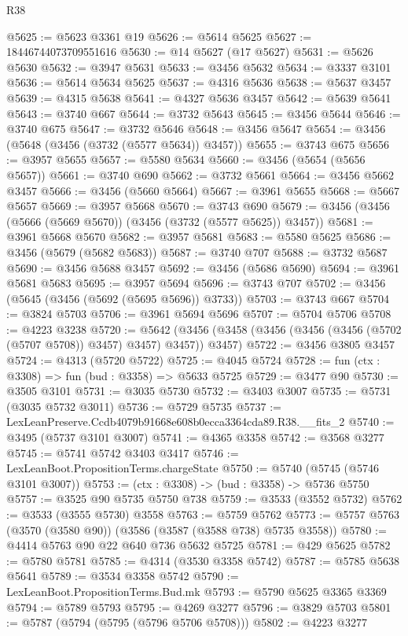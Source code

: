 \begin{lexlean}{R38}
\begin{coremodule}
@5625 := @5623 @3361 @19
@5626 := @5614 @5625
@5627 := 18446744073709551616
@5630 := @14 @5627 (@17 @5627)
@5631 := @5626 @5630
@5632 := @3947 @5631
@5633 := @3456 @5632
@5634 := @3337 @3101
@5636 := @5614 @5634 @5625
@5637 := @4316 @5636
@5638 := @5637 @3457
@5639 := @4315 @5638
@5641 := @4327 @5636 @3457
@5642 := @5639 @5641
@5643 := @3740 @667
@5644 := @3732 @5643
@5645 := @3456 @5644
@5646 := @3740 @675
@5647 := @3732 @5646
@5648 := @3456 @5647
@5654 := @3456 (@5648 (@3456 (@3732 (@5577 @5634)) @3457))
@5655 := @3743 @675
@5656 := @3957 @5655
@5657 := @5580 @5634
@5660 := @3456 (@5654 (@5656 @5657))
@5661 := @3740 @690
@5662 := @3732 @5661
@5664 := @3456 @5662 @3457
@5666 := @3456 (@5660 @5664)
@5667 := @3961 @5655
@5668 := @5667 @5657
@5669 := @3957 @5668
@5670 := @3743 @690
@5679 := @3456 (@3456 (@5666 (@5669 @5670)) (@3456 (@3732 (@5577 @5625)) @3457))
@5681 := @3961 @5668 @5670
@5682 := @3957 @5681
@5683 := @5580 @5625
@5686 := @3456 (@5679 (@5682 @5683))
@5687 := @3740 @707
@5688 := @3732 @5687
@5690 := @3456 @5688 @3457
@5692 := @3456 (@5686 @5690)
@5694 := @3961 @5681 @5683
@5695 := @3957 @5694
@5696 := @3743 @707
@5702 := @3456 (@5645 (@3456 (@5692 (@5695 @5696)) @3733))
@5703 := @3743 @667
@5704 := @3824 @5703
@5706 := @3961 @5694 @5696
@5707 := @5704 @5706
@5708 := @4223 @3238
@5720 := @5642 (@3456 (@3458 (@3456 (@3456 (@3456 (@5702 (@5707 @5708)) @3457) @3457) @3457)) @3457)
@5722 := @3456 @3805 @3457
@5724 := @4313 (@5720 @5722)
@5725 := @4045 @5724
@5728 := fun (ctx : @3308) => fun (bud : @3358) => @5633 @5725
@5729 := @3477 @90
@5730 := @3505 @3101
@5731 := @3035 @5730
@5732 := @3403 @3007
@5735 := @5731 (@3035 @5732 @3011)
@5736 := @5729 @5735
@5737 := LexLeanPreserve.Ccdb4079b91668e608b0ecca3364cda89.R38.__fits_2
@5740 := @3495 (@5737 @3101 @3007)
@5741 := @4365 @3358
@5742 := @3568 @3277
@5745 := @5741 @5742 @3403 @3417
@5746 := LexLeanBoot.PropositionTerms.chargeState
@5750 := @5740 (@5745 (@5746 @3101 @3007))
@5753 := (ctx : @3308) -> (bud : @3358) -> @5736 @5750
@5757 := @3525 @90 @5735 @5750 @738
@5759 := @3533 (@3552 @5732)
@5762 := @3533 (@3555 @5730) @3558
@5763 := @5759 @5762
@5773 := @5757 @5763 (@3570 (@3580 @90)) (@3586 (@3587 (@3588 @738) @5735 @3558))
@5780 := @4414 @5763 @90 @22 @640 @736 @5632 @5725
@5781 := @429 @5625
@5782 := @5780 @5781
@5785 := @4314 (@3530 @3358 @5742)
@5787 := @5785 @5638 @5641
@5789 := @3534 @3358 @5742
@5790 := LexLeanBoot.PropositionTerms.Bud.mk
@5793 := @5790 @5625 @3365 @3369
@5794 := @5789 @5793
@5795 := @4269 @3277
@5796 := @3829 @5703
@5801 := @5787 (@5794 (@5795 (@5796 @5706 @5708)))
@5802 := @4223 @3277

\end{coremodule}
\end{lexlean}
